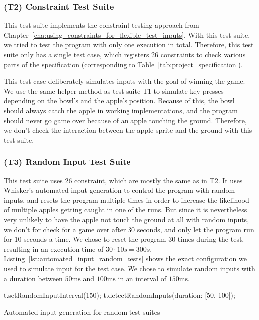 \subsubsection{(T2) Constraint Test Suite}

This test suite implements the constraint testing approach from Chapter~\ref{cha:using_constraints_for_flexible_test_inputs}.
With this test suite, we tried to test the program with only one execution in total.
Therefore, this test suite only has a single test case, which registers 26 constraints to check various parts of the specification
(corresponding to Table~\ref{tab:project_specification}).
\parspace

This test case deliberately simulates inputs with the goal of winning the game.
We use the same helper method as test suite T1 to simulate key presses depending on the bowl's and the apple's position.
Because of this, the bowl should always catch the apple in working implementations,
and the program should never go game over because of an apple touching the ground.
Therefore, we don't check the interaction between the apple sprite and the ground with this test suite.

\subsubsection{(T3) Random Input Test Suite}

This test suite uses 26 constraint, which are mostly the same as in T2.
It uses Whisker's automated input generation to control the program with random inputs,
and resets the program multiple times in order to increase the likelihood of multiple apples getting caught in one of the runs.
But since it is nevertheless very unlikely to have the apple not touch the ground at all with random inputs,
we don't for check for a game over after 30 seconds, and only let the program run for 10 seconds a time.
We chose to reset the program 30 times during the test, resulting in an execution time of $30 \cdot 10s = 300s$.
Listing~\ref{lst:automated_input_random_tests} shows the exact configuration we used to simulate input for the test case.
We chose to simulate random inputs with a duration between $50\text{ms}$ and $100\text{ms}$ in an interval of $150\text{ms}$.
\parspace

\begin{listing}[htpb]
    \centering
    \begin{minipage}{.55\textwidth}
        \begin{javascriptcode}
            t.setRandomInputInterval(150);
            t.detectRandomInputs({duration: [50, 100]});
        \end{javascriptcode}
    \end{minipage}
    \caption{Automated input generation for random test suites}
    \label{lst:automated_input_random_tests}
\end{listing}


